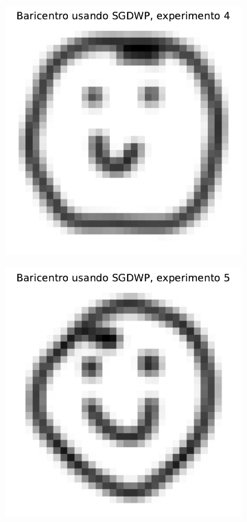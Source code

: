 \begin{figure}[H]
\begin{subfigure}[b]{0.17\textwidth}
        \label{fig:bar-SGDWP-exp-03}
    \end{subfigure}
    \hfill
    \begin{subfigure}[b]{0.17\textwidth}
        \centering
        \includegraphics[width=\textwidth]{img/sgdwp/bar-SGDWP-exp-04.pdf}
        \label{fig:bar-SGDWP-exp-04}
    \end{subfigure}
    \hfill
    \begin{subfigure}[b]{0.17\textwidth}
        \centering
        \includegraphics[width=\textwidth]{img/sgdwp/bar-SGDWP-exp-05.pdf}

\end{subfigure}
\end{figure}
